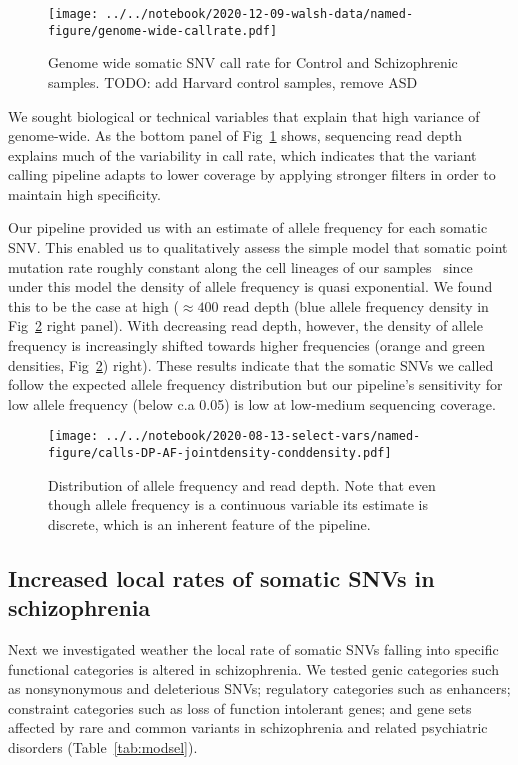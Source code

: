 \documentclass[letterpaper]{article}
\begin{document}
\begin{figure}
\texttt{[image: ../../notebook/2020-12-09-walsh-data/named-figure/genome-wide-callrate.pdf]}
\caption{Genome wide somatic SNV call rate for Control and Schizophrenic samples.  TODO:
	add Harvard control samples, remove ASD}
\label{fig:genomewide-calls}
\end{figure}

We sought biological or technical variables that explain that high variance of
genome-wide.  As the bottom panel of Fig~\ref{fig:genomewide-calls} shows,
sequencing read depth explains much of the variability in call rate, which
indicates that the variant calling pipeline adapts to lower coverage by
applying stronger filters in order to maintain high specificity.

Our pipeline provided us with an estimate of allele frequency for each somatic
SNV.  This enabled us to qualitatively assess the simple model that somatic
point mutation rate roughly constant along the cell lineages of our
samples~\citep{Rodin2021} since under this model the density of allele
frequency is quasi exponential.  We found this to be the case at high
(\(\approx 400\) read depth (blue allele frequency density in Fig~\ref{fig:AF}
right panel).  With decreasing read depth, however, the density of allele
frequency is increasingly shifted towards higher frequencies (orange and green
densities, Fig~\ref{fig:AF}) right).  These results indicate that the somatic
SNVs we called follow the expected allele frequency distribution but our
pipeline's sensitivity for low allele frequency (below c.a 0.05) is low at
low-medium sequencing coverage.

\begin{figure}
\texttt{[image: ../../notebook/2020-08-13-select-vars/named-figure/calls-DP-AF-jointdensity-conddensity.pdf]}
\caption{
Distribution of allele frequency and read depth.  Note that even though allele frequency is
a continuous variable its estimate is discrete, which is an inherent feature
of the pipeline.
}
\label{fig:AF}
\end{figure}

\subsection*{Increased local rates of somatic SNVs in schizophrenia}

Next we investigated weather the local rate of somatic SNVs falling into
specific functional categories is altered in schizophrenia.  We
tested genic categories such as nonsynonymous and deleterious SNVs;
regulatory categories such as enhancers; constraint
categories such as loss of function intolerant genes; and gene sets affected
by rare and common variants in schizophrenia and related psychiatric
disorders (Table~\ref{tab:modsel}).
\end{document}
